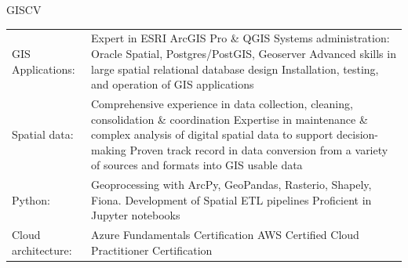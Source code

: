 \documentclass[letterpaper]{article}
\newenvironment{skillslist}
        {
            \begin{tabular}[t]{ l L{5.17in} }
        }{
            \end{tabular}
        }
\begin{document}
    \begin{taggedblock}{GISCV}
        \begin{skillslist}
            GIS Applications:&
                Expert in ESRI ArcGIS Pro \& QGIS \linebreak
                Systems administration: Oracle Spatial, Postgres/PostGIS, Geoserver \linebreak
                Advanced skills in large spatial relational database design \linebreak
                Installation, testing, and operation of GIS applications \linebreak
                \\
            Spatial data:&
                Comprehensive experience in data collection, cleaning, consolidation \& coordination \linebreak
                Expertise in maintenance \& complex analysis of digital spatial data to support decision-making \linebreak
                Proven track record in data conversion from a variety of sources and formats into GIS usable data \linebreak
                \\
            Python:&
                Geoprocessing with ArcPy, GeoPandas, Rasterio, Shapely, Fiona. \linebreak
                Development of Spatial ETL pipelines \linebreak
                Proficient in Jupyter notebooks \linebreak
                \\
            Cloud architecture:&
                Azure Fundamentals Certification \linebreak
                AWS Certified Cloud Practitioner Certification

\end{skillslist}
\end{taggedblock}
\end{document}
